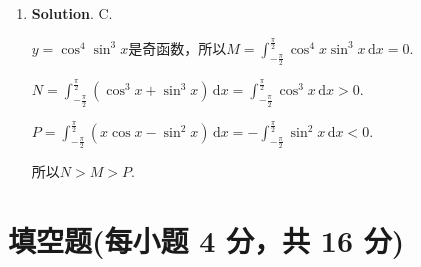 \documentclass[../Main.tex]{subfiles}
\begin{document}
\begin{enumerate}
    \item \textbf{Solution}. C.

          $y=\cos^{4}\sin^{3} x$是奇函数，所以$M=\int_{-\frac{\pi}{2}}^{\frac{\pi}{2}}
              \cos^{4} x\sin^{3} x\,\mathrm{d}x=0$.

          $N=\int_{-\frac{\pi}{2}}^{\frac{\pi}{2}}\left(\cos^{3} x+\sin^{3} x\right)\,\mathrm{d}
              x=\int_{-\frac{\pi}{2}}^{\frac{\pi}{2}}\cos^{3} x\,\mathrm{d}x>0$.

          $P=\int_{-\frac{\pi}{2}}^{\frac{\pi}{2}}\left(x\cos x-\sin^{2} x\right)\,\mathrm{d}
              x=-\int_{-\frac{\pi}{2}}^{\frac{\pi}{2}}\sin^{2} x\,\mathrm{d}x<0$.

          所以$N>M>P$.
\end{enumerate}

\section{填空题(每小题 4 分，共 16 分)}
\end{document}

